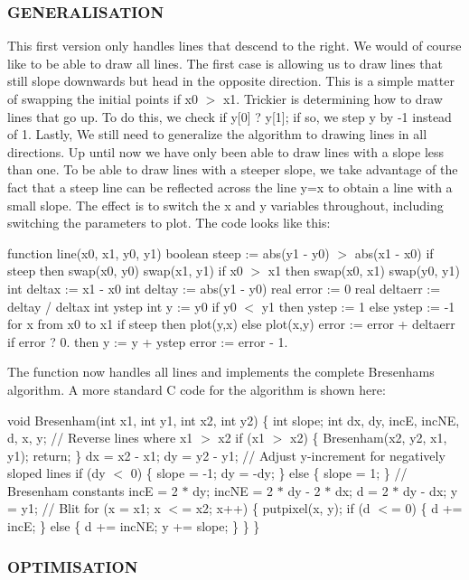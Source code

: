 \subsubsection*{G\+E\+N\+E\+R\+A\+L\+I\+S\+A\+T\+I\+ON}

This first version only handles lines that descend to the right. We would of course like to be able to draw all lines. The first case is allowing us to draw lines that still slope downwards but head in the opposite direction. This is a simple matter of swapping the initial points if x0 $>$ x1. Trickier is determining how to draw lines that go up. To do this, we check if y\mbox{[}0\mbox{]} ? y\mbox{[}1\mbox{]}; if so, we step y by -\/1 instead of 1. Lastly, We still need to generalize the algorithm to drawing lines in all directions. Up until now we have only been able to draw lines with a slope less than one. To be able to draw lines with a steeper slope, we take advantage of the fact that a steep line can be reflected across the line y=x to obtain a line with a small slope. The effect is to switch the x and y variables throughout, including switching the parameters to plot. The code looks like this\+:

function line(x0, x1, y0, y1) boolean steep \+:= abs(y1 -\/ y0) $>$ abs(x1 -\/ x0) if steep then swap(x0, y0) swap(x1, y1) if x0 $>$ x1 then swap(x0, x1) swap(y0, y1) int deltax \+:= x1 -\/ x0 int deltay \+:= abs(y1 -\/ y0) real error \+:= 0 real deltaerr \+:= deltay / deltax int ystep int y \+:= y0 if y0 $<$ y1 then ystep \+:= 1 else ystep \+:= -\/1 for x from x0 to x1 if steep then plot(y,x) else plot(x,y) error \+:= error + deltaerr if error ? 0. then y \+:= y + ystep error \+:= error -\/ 1.

The function now handles all lines and implements the complete Bresenham\textquotesingle{}s algorithm. A more standard C code for the algorithm is shown here\+:

void Bresenham(int x1, int y1, int x2, int y2) \{ int slope; int dx, dy, incE, inc\+NE, d, x, y; // Reverse lines where x1 $>$ x2 if (x1 $>$ x2) \{ Bresenham(x2, y2, x1, y1); return; \} dx = x2 -\/ x1; dy = y2 -\/ y1; // Adjust y-\/increment for negatively sloped lines if (dy $<$ 0) \{ slope = -\/1; dy = -\/dy; \} else \{ slope = 1; \} // Bresenham constants incE = 2 $\ast$ dy; inc\+NE = 2 $\ast$ dy -\/ 2 $\ast$ dx; d = 2 $\ast$ dy -\/ dx; y = y1; // Blit for (x = x1; x $<$= x2; x++) \{ putpixel(x, y); if (d $<$= 0) \{ d += incE; \} else \{ d += inc\+NE; y += slope; \} \} \}

\subsubsection*{O\+P\+T\+I\+M\+I\+S\+A\+T\+I\+ON}

